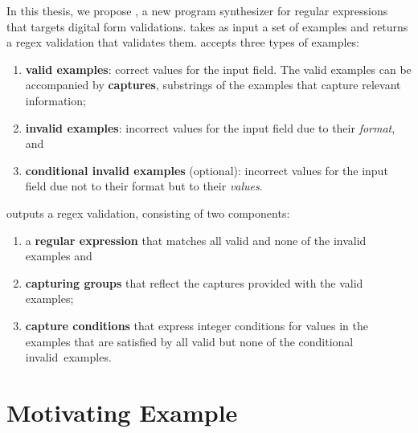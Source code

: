 In this thesis, we propose \Forest{}, a new program synthesizer for regular expressions that targets digital form validations.
\Forest takes as input a set of examples and returns a regex validation that validates them.
\Forest accepts three types of examples:
\begin{enumerate}%
    \item \textbf{valid examples}: correct values for the input field. The valid examples can be accompanied by \textbf{captures}, substrings of the examples that capture relevant information;
    \item \textbf{invalid examples}: incorrect values for the input field due to their \textit{format}, and
    \item \textbf{conditional invalid examples} (optional): incorrect values for the input field due not to their format but to their \textit{values}.
\end{enumerate}
%
\Forest outputs a regex validation, consisting of two components:
\begin{enumerate}%
    \item a \textbf{regular expression} that matches all valid and none of the invalid examples and
    \item \textbf{capturing groups} that reflect the captures provided with the valid examples;
    \item \textbf{capture conditions} that express integer conditions for values in the examples that are satisfied by all valid but none of the conditional invalid~examples.
\end{enumerate}

\section{Motivating Example}\label{sec:motivating-example}

